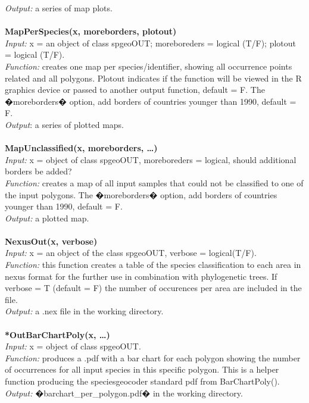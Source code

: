 \documentclass[a4paper,titlepage,11pt]{scrreprt}
\begin{document}
\textit{Output:} a series of map plots.\\
\\
\textbf{MapPerSpecies(x, moreborders, plotout)}\\
\textit{Input:} x = an object of class spgeoOUT; moreboreders = logical (T/F); plotout = logical (T/F).\\
\textit{Function:} creates one map per species/identifier, showing all occurrence points related and all polygons. Plotout indicates if the function will be viewed in the R graphics device or passed to another output function, default = F. The �moreborders� option, add borders of countries younger than 1990, default = F.\\
\textit{Output}: a series of plotted maps.\\
\\
\textbf{MapUnclassified(x, moreborders, \dots)}\\
\textit{Input:} x = object of class spgeoOUT, moreboreders = logical, should additional borders be added?\\
\textit{Function:} creates a map of all input samples that could not be classified to one of the input polygons. The �moreborders� option, add borders of countries younger than 1990, default = F.\\
\textit{Output:} a plotted map.\\
\\
\textbf{NexusOut(x, verbose)}\\
\textit{Input:} x = an object of the class spgeoOUT, verbose = logical(T/F).\\
\textit{Function:} this function creates a table of the species classification to each area in nexus format for the further use in combination with phylogenetic trees. If verbose = T (default = F) the number of occurences per area are included in the file.\\
\textit{Output:} a .nex file in the working directory.\\
\\
\textbf{*OutBarChartPoly(x, \dots)}\\
\textit{Input:} x = object of class spgeoOUT.\\
\textit{Function:} produces a .pdf with a bar chart for each polygon showing the  number of occurrences for all input species in this specific polygon. This is a helper function producing the speciesgeocoder standard pdf from BarChartPoly().\\
\textit{Output:} �barchart\_per\_polygon.pdf� in the working directory.\\
\end{document}
